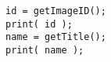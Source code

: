 \begin{lstlisting}
id = getImageID();
print( id );
name = getTitle();
print( name );

\end{lstlisting}